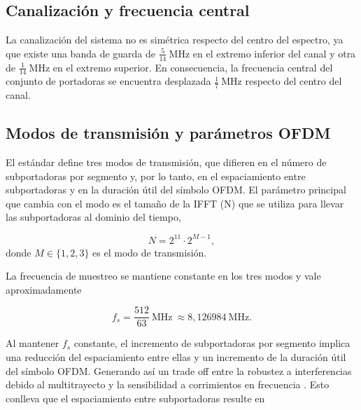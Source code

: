 
\subsection{Canalización y frecuencia central}

La canalización del sistema no es simétrica respecto del centro del espectro, ya que existe una banda de guarda de $\frac{5}{14}\ \mathrm{MHz}$ en el extremo inferior del canal y otra de $\frac{1}{14}\ \mathrm{MHz}$ en el extremo superior. En consecuencia, la frecuencia central del conjunto de portadoras se encuentra desplazada $\frac{1}{7}\ \mathrm{MHz} $ respecto del centro del canal.


\subsection{Modos de transmisión y parámetros OFDM}
El estándar define tres modos de transmisión, que difieren en el número de subportadoras por segmento y, por lo tanto, en el espaciamiento entre subportadoras y en la duración útil del símbolo OFDM. El parámetro principal que cambia con el modo es el tamaño de la IFFT (N) que se utiliza para llevar las subportadoras al dominio del tiempo,

\begin{equation}
N = 2^{11}\cdot 2^{M-1},
\end{equation}
donde $M\in\{1,2,3\}$ es el modo de transmisión.

La frecuencia de muestreo se mantiene constante en los tres modos y vale aproximadamente

\begin{equation}
f_s = \frac{512}{63}\ \mathrm{MHz}\ \approx 8{,}126984\ \mathrm{MHz}.
\end{equation}

Al mantener $f_s$ constante, el incremento de subportadoras por segmento implica una reducción del espaciamiento entre ellas y un incremento de la duración útil del símbolo OFDM. Generando así un trade off entre la robustez a interferencias debido al multitrayecto y la sensibilidad a corrimientos en frecuencia \cite{uruguay_tx}. Esto conlleva que el espaciamiento entre subportadoras resulte en

